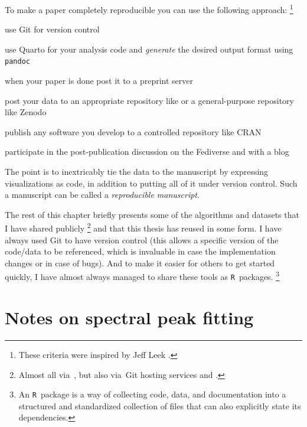 \documentclass[draft,webedition,openright,titles,swedish,english]{LuaUUThesis}\usepackage[]{graphicx}\usepackage[]{xcolor}
\newcommand{\R}{\texttt{R}}
\newcommand{\via}{via}
\begin{document}
To make a paper completely reproducible you can use the following approach:%
\footnote{These criteria were inspired by Jeff Leek .}
\begin{enumerate*}[label=(\roman*),itemjoin={{, }},itemjoin*={{, and }}]
   \item use Git for version control
   \item use Quarto for your analysis code and \emph{generate} the desired output format using \texttt{pandoc}
   \item when your paper is done post it to a preprint server
   \item post your data to an appropriate repository like 
      or a general-purpose repository like Zenodo
   \item publish any software you develop to a controlled repository like CRAN
   \item participate in the post-publication discussion on the Fediverse and with a blog
\end{enumerate*}
The point is to inextricably tie the data to the manuscript by expressing
visualizations as code, in addition to putting all of it under version control.
Such a manuscript can be called a \emph{reproducible manuscript}.


The rest of this chapter briefly presents some of the algorithms and datasets that
I have shared publicly%
\footnote{
   Almost all \via\ ,
   but also \via\ Git hosting services
    and
   .
}
and that this thesis has reused in some form.
I have always used Git to have version control (this allows a specific version
of the code/data to be referenced, which is invaluable in case the implementation
changes or in case of bugs).
And to make it easier for others to get started quickly, I have almost always
managed to share these tools as \R\ packages.%
\footnote{%
   An \R\ package is a way of collecting code, data, and documentation into
   a structured and standardized collection of files that can also explicitly
   state its dependencies.
}



\section{Notes on spectral peak fitting}
\label{method-development:spectral-peak-fitting}
\end{document}
